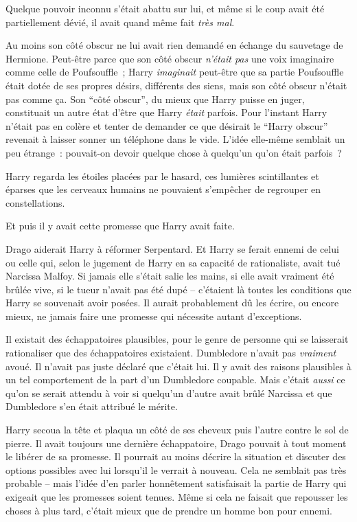 Quelque pouvoir inconnu s'était abattu sur lui, et même si le coup avait été partiellement dévié, il avait quand même fait \emph{très mal}.

Au moins son côté obscur ne lui avait rien demandé en échange du sauvetage de Hermione. Peut-être parce que son côté obscur \emph{n'était pas} une voix imaginaire comme celle de Poufsouffle~; Harry \emph{imaginait} peut-être que sa partie Poufsouffle était dotée de ses propres désirs, différents des siens, mais son côté obscur n'était pas comme ça. Son “côté obscur”, du mieux que Harry puisse en juger, constituait un autre état d'être que Harry \emph{était} parfois. Pour l'instant Harry n'était pas en colère et tenter de demander ce que désirait le “Harry obscur” revenait à laisser sonner un téléphone dans le vide. L'idée elle-même semblait un peu étrange~: pouvait-on devoir quelque chose à quelqu'un qu'on était parfois~?

Harry regarda les étoiles placées par le hasard, ces lumières scintillantes et éparses que les cerveaux humains ne pouvaient s'empêcher de regrouper en constellations.

Et puis il y avait cette promesse que Harry avait faite.

Drago aiderait Harry à réformer Serpentard. Et Harry se ferait ennemi de celui ou celle qui, selon le jugement de Harry en sa capacité de rationaliste, avait tué Narcissa Malfoy. Si jamais elle s'était salie les mains, si elle avait vraiment été brûlée vive, si le tueur n'avait pas été dupé -- c'étaient là toutes les conditions que Harry se souvenait avoir posées. Il aurait probablement dû les écrire, ou encore mieux, ne jamais faire une promesse qui nécessite autant d'exceptions.

Il existait des échappatoires plausibles, pour le genre de personne qui se laisserait rationaliser que des échappatoires existaient. Dumbledore n'avait pas \emph{vraiment} avoué. Il n'avait pas juste déclaré que c'était lui. Il y avait des raisons plausibles à un tel comportement de la part d'un Dumbledore coupable. Mais c'était \emph{aussi} ce qu'on se serait attendu à voir si quelqu'un d'autre avait brûlé Narcissa et que Dumbledore s'en était attribué le mérite.

Harry secoua la tête et plaqua un côté de ses cheveux puis l'autre contre le sol de pierre. Il avait toujours une dernière échappatoire, Drago pouvait à tout moment le libérer de sa promesse. Il pourrait au moins décrire la situation et discuter des options possibles avec lui lorsqu'il le verrait à nouveau. Cela ne semblait pas très probable -- mais l'idée d'en parler honnêtement satisfaisait la partie de Harry qui exigeait que les promesses soient tenues. Même si cela ne faisait que repousser les choses à plus tard, c'était mieux que de prendre un homme bon pour ennemi.

